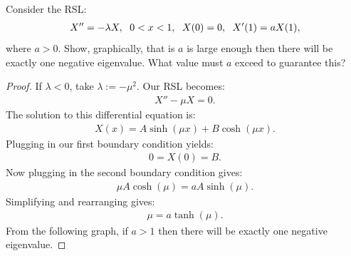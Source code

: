\documentclass[10pt,oneside,openany]{memoir}
\begin{document}
\newpage
\begin{exercise}[manual-num={4}]
Consider the RSL:
    \begin{equation*}
    \begin{split}
        X'' = -\lambda X, \h6 0<x<1, \h6X(0) = 0,\h6 X'(1) = aX(1),
    \end{split}
    \end{equation*}
where $a > 0$. Show, graphically, that is $a$ is large enough then there will be exactly one negative eigenvalue. What value must $a$ exceed to guarantee this?
\end{exercise}
    \begin{proof}
        If $\lambda < 0$, take $\lambda := -\mu^2$. Our RSL becomes:
            \begin{equation*}
            \begin{split}
                X'' - \mu X = 0.
            \end{split}
            \end{equation*}
        The solution to this differential equation is:
            \begin{equation*}
            \begin{split}
                X(x) = A \sinh(\mu x) + B \cosh(\mu x).
            \end{split}
            \end{equation*}
        Plugging in our first boundary condition yields:
            \begin{equation*}
            \begin{split}
                0 = X(0) = B.
            \end{split}
            \end{equation*}
        Now plugging in the second boundary condition gives:
            \begin{equation*}
            \begin{split}
                \mu A \cosh (\mu) = a A \sinh(\mu). 
            \end{split}
            \end{equation*}
        Simplifying and rearranging gives:
            \begin{equation*}
            \begin{split}
                \mu = a \tanh(\mu).
            \end{split}
            \end{equation*}
        From the following graph, if $a > 1$ then there will be exactly one negative eigenvalue.

\end{proof}
\end{document}

